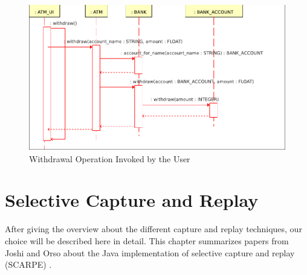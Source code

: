 \begin{figure}[ht]
   \centering
   \includegraphics[width=1\textwidth]{illustrations/example_withdrawal}
   \caption{Withdrawal Operation Invoked by the User}
   \label{fig:example_class_diagram}
\end{figure}

\section{Selective Capture and Replay}
After giving the overview about the different capture and replay techniques, our choice will be described here in detail. This chapter summarizes papers from Joshi and Orso about the Java implementation of selective capture and replay (SCARPE) \cite{orso05may, orso06}.

